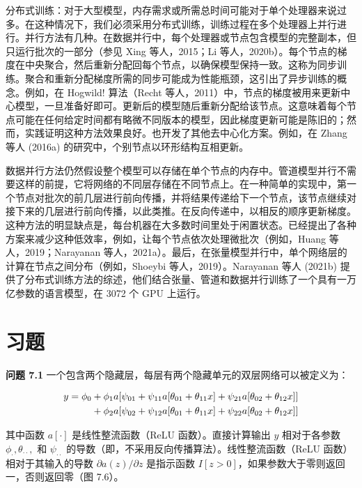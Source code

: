分布式训练：对于大型模型，内存需求或所需总时间可能对于单个处理器来说过多。在这种情况下，我们必须采用分布式训练，训练过程在多个处理器上并行进行。并行方法有几种。在数据并行中，每个处理器或节点包含模型的完整副本，但只运行批次的一部分（参见 Xing 等人，2015；Li 等人，2020b）。每个节点的梯度在中央聚合，然后重新分配回每个节点，以确保模型保持一致。这称为同步训练。聚合和重新分配梯度所需的同步可能成为性能瓶颈，这引出了异步训练的概念。例如，在 Hogwild! 算法（Recht 等人，2011）中，节点的梯度被用来更新中心模型，一旦准备好即可。更新后的模型随后重新分配给该节点。这意味着每个节点可能在任何给定时间都有略微不同版本的模型，因此梯度更新可能是陈旧的；然而，实践证明这种方法效果良好。也开发了其他去中心化方案。例如，在 Zhang 等人 (2016a) 的研究中，个别节点以环形结构互相更新。

数据并行方法仍然假设整个模型可以存储在单个节点的内存中。管道模型并行不需要这样的前提，它将网络的不同层存储在不同节点上。在一种简单的实现中，第一个节点对批次的前几层进行前向传播，并将结果传递给下一个节点，该节点继续对接下来的几层进行前向传播，以此类推。在反向传递中，以相反的顺序更新梯度。这种方法的明显缺点是，每台机器在大多数时间里处于闲置状态。已经提出了各种方案来减少这种低效率，例如，让每个节点依次处理微批次（例如，Huang 等人，2019；Narayanan 等人，2021a）。最后，在张量模型并行中，单个网络层的计算在节点之间分布（例如，Shoeybi 等人，2019）。Narayanan 等人 (2021b) 提供了分布式训练方法的综述，他们结合张量、管道和数据并行训练了一个具有一万亿参数的语言模型，在 3072 个 GPU 上运行。

\section{习题}  
\textbf{问题 7.1} 一个包含两个隐藏层，每层有两个隐藏单元的双层网络可以被定义为：

\begin{align}
y = \phi_0 &+ \phi_1a[\psi_{01} + \psi_{11}a[\theta_{01} + \theta_{11}x] + \psi_{21}a[\theta_{02} + \theta_{12}x]] \notag \\
&+ \phi_2a[\psi_{02} + \psi_{12}a[\theta_{01} + \theta_{11}x] + \psi_{22}a[\theta_{02} + \theta_{12}x]] 
\end{align} 


其中函数 \(a[\cdot]\) 是线性整流函数（ReLU 函数）。直接计算输出 \(y\) 相对于各参数 \(\phi_\cdot, \theta_{\cdot\cdot},\) 和 \(\psi_{\cdot\cdot}\) 的导数（即，不采用反向传播算法）。线性整流函数（ReLU 函数）相对于其输入的导数 \(\partial a(z)/\partial z\) 是指示函数 \(I[z > 0]\)，如果参数大于零则返回一，否则返回零（图 7.6）。

